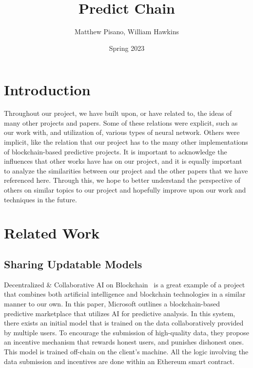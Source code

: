 \documentclass{article}
\title{Predict Chain}
\author{Matthew Pisano, William Hawkins}
\date{Spring 2023}
\begin{document}
    \maketitle

    \section{Introduction}

    Throughout our project, we have built upon, or have related to, the ideas of many other projects and papers.
    Some of these relations were explicit, such as our work with, and utilization of, various types of neural
    network.  Others were implicit, like the relation that our project has to the many other implementations of
    blockchain-based predictive projects.  It is important to acknowledge the influences that other works have
    has on our project, and it is equally important to analyze the similarities between our project and the
    other papers that we have referenced here.  Through this, we hope to better understand the perspective of
    others on similar topics to our project and hopefully improve upon our work and techniques in the future.


    \section{Related Work}
    
    \subsection{Sharing Updatable Models}

    Decentralized \& Collaborative AI on Blockchain~\cite{sharingModels} is a great example of a project that combines
    both artificial intelligence and blockchain technologies in a similar manner to our own.  In this paper, Microsoft
    outlines a blockchain-based predictive marketplace that utilizes AI for predictive analysis.  In this system, there
    exists an initial model that is trained on the data collaboratively provided by multiple users.  To encourage
    the submission of high-quality data, they propose an incentive mechanism that rewards honest users, and punishes
    dishonest ones.  This model is trained off-chain on the client's machine.  All the logic involving the
    data submission and incentives are done within an Ethereum smart contract.
    
\end{document}
